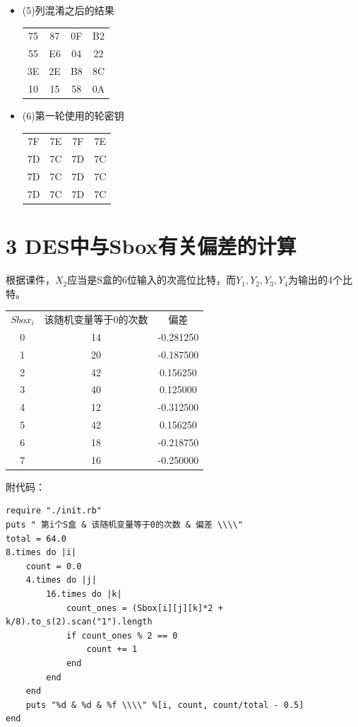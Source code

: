 \documentclass[10pt,a4paper]{article}
\begin{document}
\begin{itemize}
    \item[] (5)列混淆之后的结果

    \begin{tabular}{cccc}
        75 & 87 & 0F & B2 \\
        55 & E6 & 04 & 22 \\
        3E & 2E & B8 & 8C \\
        10 & 15 & 58 & 0A \\
    \end{tabular}

    \item[] (6)第一轮使用的轮密钥
    
    \begin{tabular}{cccc}
        7F & 7E & 7F & 7E \\
        7D & 7C & 7D & 7C \\
        7D & 7C & 7D & 7C \\
        7D & 7C & 7D & 7C \\
    \end{tabular}


\end{itemize}

\section*{3 DES中与Sbox有关偏差的计算}
根据课件，$X_2$应当是S盒的6位输入的次高位比特，而$Y_1,Y_2,Y_3,Y_4$为输出的4个比特。


\begin{tabular}{ccc}
 $Sbox_i$ & 该随机变量等于0的次数 & 偏差 \\
0 & 14 & -0.281250 \\
1 & 20 & -0.187500 \\
2 & 42 & 0.156250 \\
3 & 40 & 0.125000 \\
4 & 12 & -0.312500 \\
5 & 42 & 0.156250 \\
6 & 18 & -0.218750 \\
7 & 16 & -0.250000 \\
\end{tabular}

附代码：
\begin{verbatim}
require "./init.rb"
puts " 第i个S盒 & 该随机变量等于0的次数 & 偏差 \\\\"
total = 64.0
8.times do |i|
    count = 0.0
    4.times do |j|
        16.times do |k|
            count_ones = (Sbox[i][j][k]*2 + k/8).to_s(2).scan("1").length
            if count_ones % 2 == 0
                count += 1
            end
        end
    end
    puts "%d & %d & %f \\\\" %[i, count, count/total - 0.5]
end
\end{verbatim}
\end{document}
